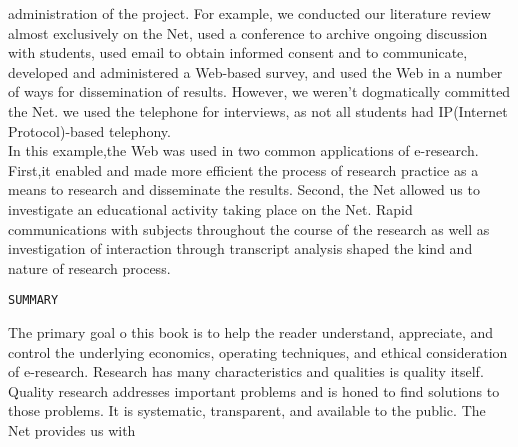 \documentclass{book}
\begin{document}
administration of the project. For example, we conducted our literature review almost
exclusively on the Net, used a conference to archive ongoing discussion with students,
used email to obtain informed consent and to communicate, developed and administered
a Web-based survey, and used the Web in a number of ways for dissemination of results.
However, we weren't dogmatically committed the Net. we used the telephone for
interviews, as not all students had IP(Internet Protocol)-based telephony.
\\\hspace*{0.5cm} In this example,the Web was used in two common applications of e-research.
First,it enabled and made more efficient the process of research practice as a means to research
and disseminate the results. Second, the Net allowed us to investigate an educational
activity taking place on the Net. Rapid communications with subjects throughout the
course of the research as well as investigation of interaction through transcript analysis
shaped the kind and nature of research process.
\begin{flushleft}
\texttt{SUMMARY}
\hspace*{0.5cm}
\end{flushleft}
\vspace*{0.3cm}
The primary goal o this book is to help the reader understand, appreciate, and
control the underlying economics, operating techniques, and ethical consideration of
e-research. Research has many characteristics and qualities is quality itself. Quality
research addresses important problems and is honed to find solutions to those problems.
It is systematic, transparent, and available to the public. The Net provides us with
\end{document}
